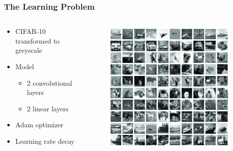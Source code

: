 \documentclass{beamer}
\begin{document}
\begin{frame}
	\frametitle{The Learning Problem}	
	\noindent
	\begin{columns}
		\begin{column}{.5\textwidth}
			\begin{itemize}
				\item CIFAR-10 transformed to greyscale
				\item Model
					\begin{itemize}
						\item 2 convolutional layers
						\item 2 linear layers
					\end{itemize}
				\item Adam optimizer
                                \item Learning rate decay
			\end{itemize}
		\end{column}
		\begin{column}{.5\textwidth} 
			\begin{figure}
				\centering
				\includegraphics[width=\textwidth]{imgs/cifar10-greyscale.png}
			\end{figure}
		\end{column}	
	\end{columns}
\end{frame}
\end{document}
